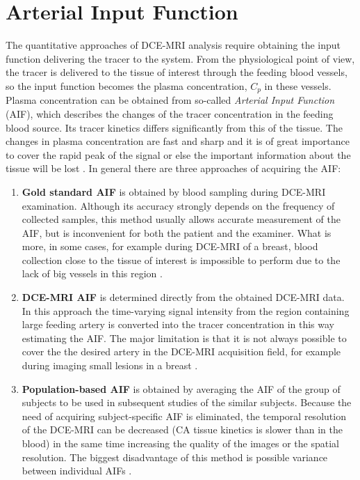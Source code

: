 \section{Arterial Input Function}
The quantitative approaches of DCE-MRI analysis require obtaining the input function delivering the tracer to the system. From the physiological point of view, the tracer is delivered to the tissue of interest through the feeding blood vessels, so the input function becomes the plasma concentration, $C_p$ in these vessels. Plasma concentration can be obtained from so-called \textit{Arterial Input Function} (AIF), which describes the changes of the tracer concentration in the feeding blood source. Its tracer kinetics differs significantly from this of the tissue. The changes in plasma concentration are fast and sharp and it is of great importance to cover the rapid peak of the signal or else the important information about the tissue will be lost \cite{khalifa2014models, jackson2005dynamic, barnes2012practical}.   
In general there are three approaches of acquiring the AIF:
\begin{enumerate}
\item{\textbf{Gold standard AIF}} is obtained by blood sampling during DCE-MRI examination.
Although its accuracy strongly depends on the frequency of collected samples, this method usually allows accurate measurement of the AIF, but is inconvenient for both the patient and the examiner.
What is more, in some cases, for example during DCE-MRI of a breast, blood collection close to the tissue of interest is impossible to perform due to the lack of big vessels in this region \cite{khalifa2014models, barnes2012practical}. 
\item{\textbf{DCE-MRI AIF}} is determined directly from the obtained DCE-MRI data. In this approach the time-varying signal intensity from the region containing large feeding artery is converted into the tracer concentration in this way estimating the AIF. The major limitation is that it is not always possible to cover the the desired artery in the DCE-MRI acquisition field, for example during imaging small lesions in a breast \cite{khalifa2014models}.   
\item{\textbf{Population-based AIF}} is obtained by averaging the AIF of the group of subjects to be used in subsequent studies of the similar subjects. Because the need of acquiring subject-specific AIF is eliminated, the temporal resolution of the DCE-MRI can be decreased (CA tissue kinetics is slower than in the blood) in the same time increasing the quality of the images or the spatial resolution. The biggest disadvantage of this method is possible variance between individual AIFs \cite{jackson2005dynamic}. 
\end{enumerate}



